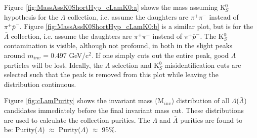 \documentclass[../AnalysisNoteJBuxton.tex]{subfiles}
\begin{document}
Figure \ref{fig:MassAssK0ShortHyp_cLamK0:a} shows the mass assuming K$^{0}_{S}$ hypothesis for the $\Lambda$ collection, i.e. assume the daughters are $\pi^{+}\pi^{-}$ instead of $\pi^{+}\bar{p}^{-}$.
Figure \ref{fig:MassAssK0ShortHyp_cLamK0:b} is a similar plot, but is for the $\bar{\Lambda}$ collection, i.e. assume the daughters are $\pi^{+}\pi^{-}$ instead of $\pi^{+}\bar{p}^{-}$.
The K$^{0}_{S}$ contamination is visible, although not profound, in both in the slight peaks around $m_{inv}$ = 0.497 GeV/c$^{2}$.
If one simply cuts out the entire peak, good $\Lambda$ particles will be lost.
Ideally, the $\Lambda$ selection and K$^{0}_{S}$ misidentification cuts are selected such that the peak is removed from this plot while leaving the distribution continuous.

Figure \ref{fig:cLamPurity} shows the invariant mass (M$_{inv}$) distribution of all $\Lambda$($\bar{\Lambda}$) candidates immediately before the final invariant mass cut.
These distributions are used to calculate the collection purities.
The $\Lambda$ and $\bar{\Lambda}$ purities are found to be: Purity($\Lambda$) $\approx$ Purity($\bar{\Lambda}$) $\approx$ 95\%.
\end{document}
